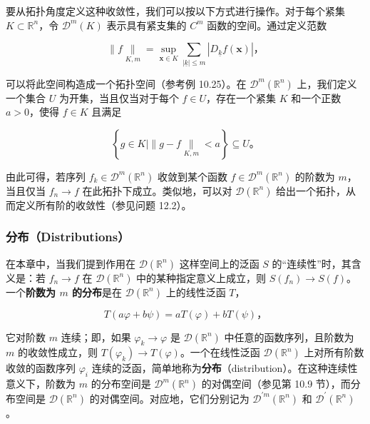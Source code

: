 要从拓扑角度定义这种收敛性，我们可以按以下方式进行操作。对于每个紧集
\(K \subset \mathbb{R}^{n}\)，令 \(\mathcal{D}^{m}(K)\) 表示具有紧支集的
\(C^{m}\) 函数的空间。通过定义范数

\[\parallel f\underset{K,m}{\parallel} = \sup\limits_{\mathbf{x} \in K}\sum_{\mid \underline{k} \mid \leq m}\left| D_{\underline{k}}f\left( \mathbf{x} \right) \right|，\]

可以将此空间构造成一个拓扑空间（参考例 10.25）。在
\(\mathcal{D}^{m}\left( \mathbb{R}^{n} \right)\) 上，我们定义一个集合
\(U\) 为开集，当且仅当对于每个 \(f \in U\)，存在一个紧集 \(K\)
和一个正数 \(a > 0\)，使得 \(f \in K\) 且满足

\[\left\{ g \in K \mid \parallel g - f\underset{K,m}{\parallel} < a \right\} \subseteq U。\]

由此可得，若序列
\(f_{k} \in \mathcal{D}^{m}\left( \mathbb{R}^{n} \right)\)
收敛到某个函数 \(f \in \mathcal{D}^{m}\left( \mathbb{R}^{n} \right)\)
的阶数为 \(m\)，当且仅当 \(f_{n} \rightarrow f\)
在此拓扑下成立。类似地，可以对
\(\mathcal{D}\left( \mathbb{R}^{n} \right)\)
给出一个拓扑，从而定义所有阶的收敛性（参见问题 12.2）。

\subsubsection{分布（Distributions）}\label{ux5206ux5e03distributions}

在本章中，当我们提到作用在 \(\mathcal{D}\left( \mathbb{R}^{n} \right)\)
这样空间上的泛函 \(S\) 的``连续性''时，其含义是：若
\(f_{n} \rightarrow f\) 在 \(\mathcal{D}\left( \mathbb{R}^{n} \right)\)
中的某种指定意义上成立，则
\(S\left( f_{n} \right) \rightarrow S(f)\)。一个\textbf{阶数为 \(m\)
的分布}是在 \(\mathcal{D}\left( \mathbb{R}^{n} \right)\) 上的线性泛函
\(T\)，

\[T(a\varphi + b\psi) = aT(\varphi) + bT(\psi)，\]

它对阶数 \(m\) 连续；即，如果 \(\varphi_{k} \rightarrow \varphi\) 是
\(\mathcal{D}\left( \mathbb{R}^{n} \right)\) 中任意的函数序列，且阶数为
\(m\) 的收敛性成立，则
\(T\left( \varphi_{k} \right) \rightarrow T(\varphi)\)。一个在线性泛函
\(\mathcal{D}\left( \mathbb{R}^{n} \right)\) 上对所有阶数收敛的函数序列
\(\varphi_{i}\)
连续的泛函，简单地称为\textbf{分布}（distribution）。在这种连续性意义下，阶数为
\(m\) 的分布空间是 \(\mathcal{D}^{m}\left( \mathbb{R}^{n} \right)\)
的对偶空间（参见第 10.9 节），而分布空间是
\(\mathcal{D}\left( \mathbb{R}^{n} \right)\)
的对偶空间。对应地，它们分别记为
\(\mathcal{D}^{\prime m}\left( \mathbb{R}^{n} \right)\) 和
\(\mathcal{D}^{\prime}\left( \mathbb{R}^{n} \right)\)。

